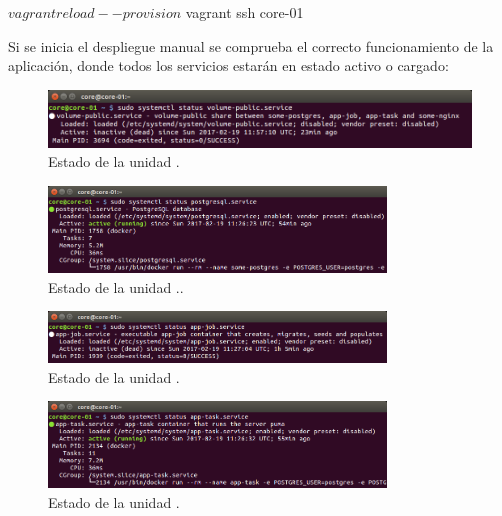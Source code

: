 \begin{code}
$ vagrant reload --provision
$ vagrant ssh core-01
\end{code}

Si se inicia el despliegue manual se comprueba el correcto funcionamiento de la aplicación, donde todos los servicios estarán en estado activo o cargado:

\begin{figure}[H]
\centering
\includegraphics[width=1\textwidth]{images/figures/volume-public.service.png}
\caption{Estado de la unidad .\label{fig:figure_placement_example}}
\end{figure}

\begin{figure}[H]
\centering
\includegraphics[width=0.8\textwidth]{images/figures/postgresql.service.png}
\caption{Estado de la unidad ..\label{fig:figure_placement_example}}
\end{figure}

\begin{figure}[H]
\centering
\includegraphics[width=0.8\textwidth]{images/figures/app-job.service.png}
\caption{Estado de la unidad .\label{fig:figure_placement_example}}
\end{figure}

\begin{figure}[H]
\centering
\includegraphics[width=0.8\textwidth]{images/figures/app-task.service.png}
\caption{Estado de la unidad .\label{fig:figure_placement_example}}
\end{figure}

